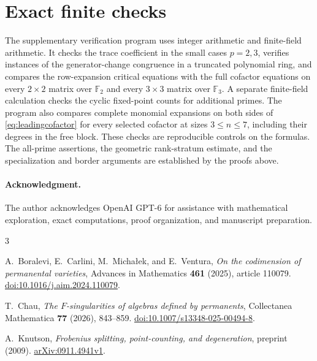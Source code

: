 \documentclass[11pt]{article}
\theoremstyle{definition}\newtheorem{definition}[theorem]{Definition}
\theoremstyle{remark}\newtheorem{remark}[theorem]{Remark}
\newcommand{\F}{\mathbb F}
\numberwithin{equation}{section}
\begin{document}
\section{Exact finite checks}
The supplementary verification program uses integer arithmetic and
finite-field arithmetic. It checks the trace coefficient in the
small cases $p=2,3$, verifies instances of the generator-change
congruence in a truncated polynomial ring, and compares the
row-expansion critical equations with the full cofactor equations
on every $2\times2$ matrix over $\F_2$ and every $3\times3$
matrix over $\F_3$. A separate finite-field calculation checks
the cyclic fixed-point counts for additional primes. The program also
compares complete monomial expansions on both sides of
\eqref{eq:leadingcofactor} for every selected cofactor at sizes
$3\le n\le7$, including their degrees in the free block. These checks
are reproducible controls on the formulas. The all-prime assertions,
the geometric rank-stratum estimate, and the specialization and
border arguments are established by the proofs above.

\paragraph{Acknowledgment.}
The author acknowledges OpenAI GPT-6 for assistance with mathematical
exploration, exact computations, proof organization, and manuscript
preparation.

\begin{thebibliography}{3}\raggedright
{}
A.~Boralevi, E.~Carlini, M.~Micha\l{}ek, and E.~Ventura,
\emph{On the codimension of permanental varieties},
Advances in Mathematics \textbf{461} (2025), article 110079.
\href{https://doi.org/10.1016/j.aim.2024.110079}{doi:10.1016/j.aim.2024.110079}.

T.~Chau, \emph{The $F$-singularities of algebras defined by permanents},
Collectanea Mathematica \textbf{77} (2026), 843--859.
\href{https://doi.org/10.1007/s13348-025-00494-8}{doi:10.1007/s13348-025-00494-8}.

A.~Knutson, \emph{Frobenius splitting, point-counting, and degeneration},
preprint (2009).
\href{https://arxiv.org/abs/0911.4941v1}{arXiv:0911.4941v1}.
\end{thebibliography}
\end{document}
